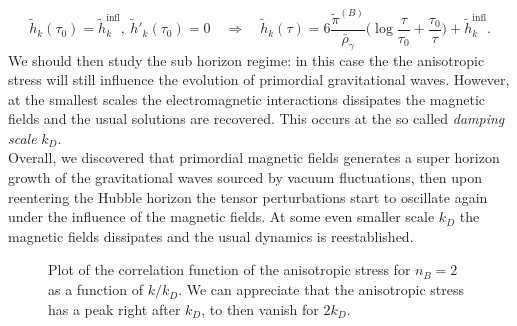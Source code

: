 $$\tilde h_k(\tau_0)=\tilde h_k^\text{infl},\ \tilde h'_k(\tau_0)=0 \quad \Rightarrow\quad \tilde h_k(\tau) = 6 \frac{\tilde\pi^{(B)}}{\bar\rho_\gamma}\bigg(\log\frac{\tau}{\tau_0}+\frac{\tau_0}{\tau}\bigg)+\tilde h_k^\text{infl}.$$
We should then study the sub horizon regime: in this case the the anisotropic stress will still influence the evolution of primordial gravitational waves. However, at the smallest scales the electromagnetic interactions dissipates the magnetic fields and the usual solutions are recovered. This occurs at the so called \emph{damping scale} $k_D$.\\Overall, we discovered that primordial magnetic fields generates a super horizon growth of the gravitational waves sourced by vacuum fluctuations, then upon reentering the Hubble horizon the tensor perturbations start to oscillate again under the influence of the magnetic fields. At some even smaller scale $k_D$ the magnetic fields dissipates and the usual dynamics is reestablished.  
\begin{figure}
    \centering
    \caption{Plot of the correlation function of the anisotropic stress for $n_B=2$ as a function of $k/k_D$. We can appreciate that the anisotropic stress has a peak right after $k_D$, to then vanish for $2k_D$.}
    \label{fig:stress_B}
\end{figure}

